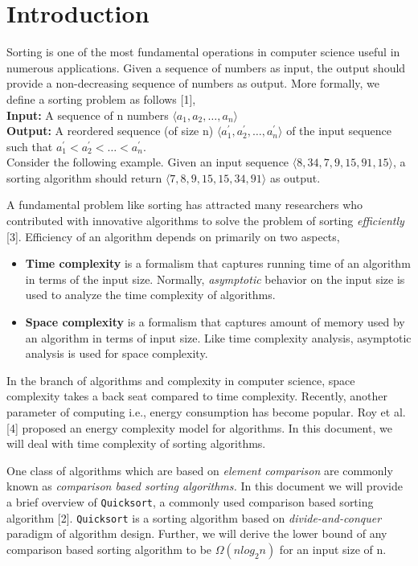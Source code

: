 \documentclass[a4paper, 10pt,twocolumn]{article}
\begin{document}
\section{Introduction}
Sorting is one of the most fundamental operations in
computer science useful in numerous applications.
Given a sequence of numbers as input, the output should
provide a non-decreasing sequence of numbers as output.
More formally, we define a sorting problem as follows [1],
\\
\textbf{Input:} A sequence of n numbers $\langle a_1, a_2, \dots, a_n \rangle$
\\
\textbf{Output:} A reordered sequence (of size n) $\langle a_1^{'}, a_2^{'}, \dots, a_n^{'} \rangle$
of the input sequence such that $ a_1^{'} < a_2^{'} < \dots < a_n^{'} $.
\\
Consider the following example. Given an input
sequence $\langle 8, 34, 7, 9, 15, 91, 15 \rangle$, a sorting algorithm
should return $\langle 7, 8, 9, 15, 15, 34, 91 \rangle$ as output.
\par
A fundamental problem like sorting has attracted
many researchers who contributed with innovative
algorithms to solve the problem of sorting \textit{efficiently} [3].
Efficiency of an algorithm depends on
primarily on two aspects,
\begin{itemize}
   \item \textbf{Time complexity} is a formalism that captures running time of an
         algorithm in terms of the input size. Normally, \textit{asymptotic}
         behavior on the input size is used to analyze the time complexity
         of algorithms.
   \item \textbf{Space complexity} is a formalism that captures amount of
         memory used by an algorithm in terms of input size. Like time
         complexity analysis, asymptotic analysis is used for space complexity.
\end{itemize}
In the branch of algorithms and complexity in computer science,
space complexity takes a back seat compared to time complexity.
Recently, another parameter of computing i.e., energy consumption
has become popular. Roy et al. [4] proposed an energy complexity
model for algorithms. In this document, we will deal with time
complexity of sorting algorithms.
\par
One class of algorithms which are based on \textit{element comparison}
are commonly known as \textit{comparison based sorting algorithms.}
In this document we will provide a brief overview of \texttt{Quicksort},
a commonly used comparison based sorting algorithm [2]. \texttt{Quicksort}
is a sorting algorithm based on \textit{divide-and-conquer} paradigm
of algorithm design. Further, we will derive the lower bound of any
comparison based sorting algorithm to be $\Omega(nlog_2n)$ for an
input size of n.
\end{document}
